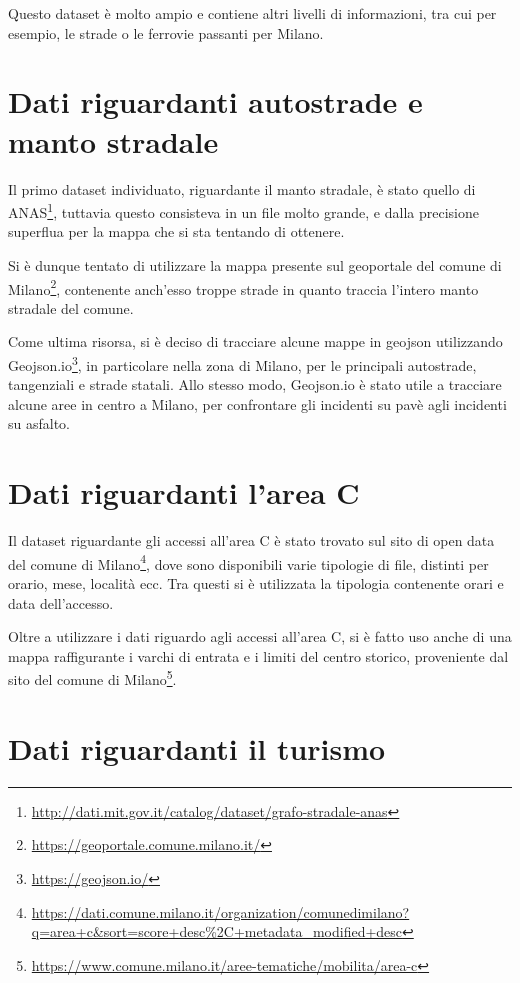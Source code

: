 \documentclass[a4paper]{report}
\begin{document}
Questo dataset è molto ampio e contiene altri livelli di informazioni, tra cui per esempio, 
le strade o le ferrovie passanti per Milano. 

\section{Dati riguardanti autostrade e manto stradale}

Il primo dataset individuato, riguardante il manto  stradale, è stato quello di 
ANAS\footnote{\url{http://dati.mit.gov.it/catalog/dataset/grafo-stradale-anas}}, 
tuttavia questo consisteva in un file molto grande, e dalla precisione superflua per 
la mappa che si sta tentando di ottenere.

Si è dunque tentato di utilizzare la mappa presente sul geoportale del comune di 
Milano\footnote{\url{https://geoportale.comune.milano.it/}}, 
contenente anch'esso troppe strade in quanto traccia l'intero manto stradale del comune.

Come ultima risorsa, si è deciso di tracciare alcune mappe in geojson utilizzando 
Geojson.io\footnote{\url{https://geojson.io/}}, in particolare nella zona di Milano, 
per le principali autostrade, tangenziali e strade statali. 
Allo stesso modo, Geojson.io è stato utile a tracciare alcune aree in centro a Milano, per confrontare 
gli incidenti su pavè agli incidenti su asfalto.

\section{Dati riguardanti l'area C}

Il dataset riguardante gli accessi all'area C è stato trovato sul sito di open data del 
comune di Milano\footnote{\url{https://dati.comune.milano.it/organization/comunedimilano?q=area+c&sort=score+desc\%2C+metadata_modified+desc}}, 
dove sono disponibili varie tipologie di file, 
distinti per orario, mese, località ecc. 
Tra questi si è utilizzata la tipologia contenente orari e data dell'accesso.

Oltre a utilizzare i dati riguardo agli accessi all'area C, si è fatto uso anche di una mappa 
raffigurante i varchi di entrata e i limiti del centro storico, 
proveniente dal sito del comune di 
Milano\footnote{\url{https://www.comune.milano.it/aree-tematiche/mobilita/area-c}}.

\section{Dati riguardanti il turismo}
\end{document}
